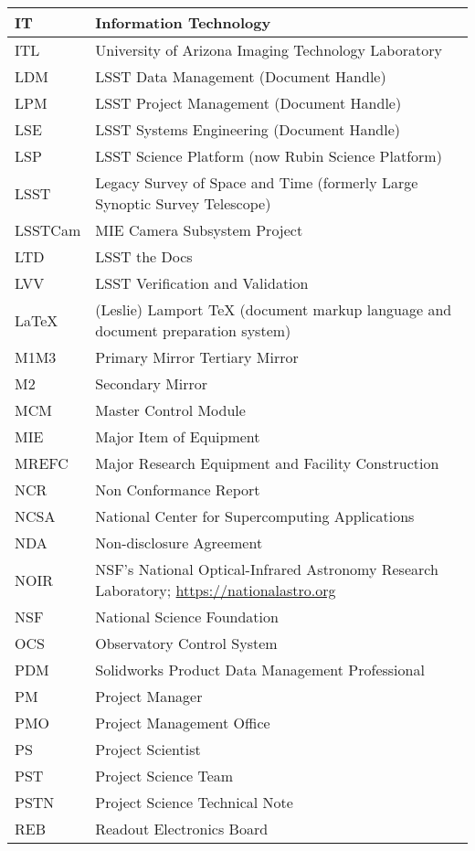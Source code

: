 \begin{longtable}{p{}p{}}
IT & Information Technology \\\hline
ITL & University of Arizona Imaging Technology Laboratory \\\hline
LDM & LSST Data Management (Document Handle) \\\hline
LPM & LSST Project Management (Document Handle) \\\hline
LSE & LSST Systems Engineering (Document Handle) \\\hline
LSP & LSST Science Platform (now Rubin Science Platform) \\\hline
LSST & Legacy Survey of Space and Time (formerly Large Synoptic Survey Telescope) \\\hline
LSSTCam & MIE Camera Subsystem Project \\\hline
LTD & LSST the Docs \\\hline
LVV & LSST Verification and Validation \\\hline
LaTeX & (Leslie) Lamport TeX (document markup language and document preparation system) \\\hline
M1M3 & Primary Mirror Tertiary Mirror \\\hline
M2 & Secondary Mirror \\\hline
MCM & Master Control Module \\\hline
MIE & Major Item of Equipment \\\hline
MREFC & Major Research Equipment and Facility Construction \\\hline
NCR & Non Conformance Report \\\hline
NCSA & National Center for Supercomputing Applications \\\hline
NDA & Non-disclosure Agreement \\\hline
NOIR & NSF's National Optical-Infrared Astronomy Research Laboratory; \url{https://nationalastro.org} \\\hline
NSF & National Science Foundation \\\hline
OCS & Observatory Control System \\\hline
PDM & Solidworks Product Data Management Professional \\\hline
PM & Project Manager \\\hline
PMO & Project Management Office \\\hline
PS & Project Scientist \\\hline
PST & Project Science Team \\\hline
PSTN & Project Science Technical Note \\\hline
REB & Readout Electronics Board \\\hline

\end{longtable}
